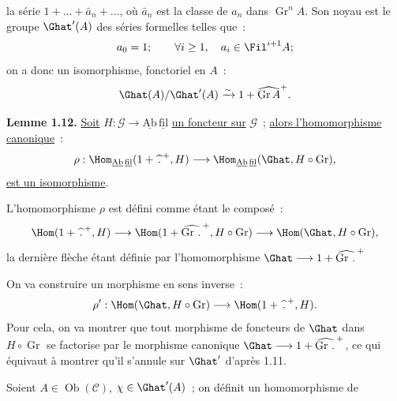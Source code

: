 
la série \(1+\ldots+\bar a_n+\ldots\), où \(\bar a_n\) est la classe de \(a_n\) dans \(\operatorname{Gr}^nA\). Son
noyau est le groupe \(\Ghat'(A)\) des séries formelles telles que~:
\[
  a_0=1;\qquad \forall i\geq1,\quad a_i\in\Fil^{i+1}A;
\]
on a donc un isomorphisme, fonctoriel en \(A\)~:
\[
  \Ghat(A)/\Ghat'(A)\xrightarrow{\sim}1+\widehat{\operatorname{Gr}A}^{+}.
\]

\textbf{Lemme 1.12.} \uline{Soit} \(H:\mathcal G\to\underline{\mathrm{Ab}}\,\underline{\mathrm{fil}}\) \uline{un foncteur sur} \(\mathcal G\)~; \uline{alors l'homomorphisme canonique}~:
\[
  \rho:\Hom_{\underline{\mathrm{Ab}}\,\underline{\mathrm{fil}}}(1+\widehat{\,\mathord{.}\,}^{+},H)
  \longrightarrow
  \Hom_{\underline{\mathrm{Ab}}\,\underline{\mathrm{fil}}}(\Ghat,H\circ\operatorname{Gr}),
\]
\uline{est un isomorphisme}.

L'homomorphisme \(\rho\) est défini comme étant le composé~:
\[
  \Hom(1+\widehat{\,\mathord{.}\,}^{+},H)
  \longrightarrow
  \Hom(1+\widehat{\operatorname{Gr}\,\mathord{.}\,}^{+},H\circ\operatorname{Gr})
  \longrightarrow
  \Hom(\Ghat,H\circ\operatorname{Gr}),
\]
la dernière flèche étant définie par l'homomorphisme \(\Ghat\longrightarrow1+\widehat{\operatorname{Gr}\,\mathord{.}\,}^{+}\)

On va construire un morphisme en sens inverse~:
\[
  \rho':\Hom(\Ghat,H\circ\operatorname{Gr})
  \longrightarrow
  \Hom(1+\widehat{\,\mathord{.}\,}^{+},H).
\]
Pour cela, on va montrer que tout morphisme de foncteurs de \(\Ghat\) dans \(H\circ\operatorname{Gr}\) se factorise par le morphisme canonique \(\Ghat\longrightarrow1+\widehat{\operatorname{Gr}\,\mathord{.}\,}^{+}\), ce qui équivaut à montrer qu'il s'annule sur \(\Ghat'\) d'après 1.11.

Soient \(A\in\operatorname{Ob}(\mathcal C)\), \(\chi\in\Ghat'(A)\)~; on définit un homomorphisme de
